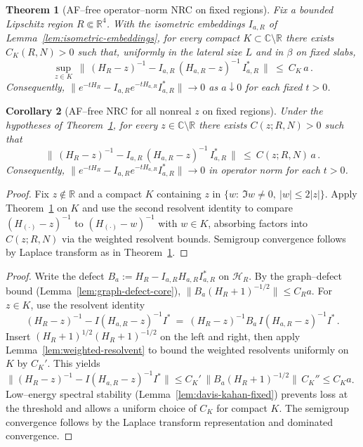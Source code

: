 \documentclass[11pt]{amsart}
\theoremstyle{plain}
\newtheorem{theorem}{Theorem}[section]
\newtheorem{corollary}[theorem]{Corollary}
\theoremstyle{definition}
\theoremstyle{remark}
\begin{document}
\begin{theorem}[AF--free operator--norm NRC on fixed regions]\label{thm:nrc-operator-norm-fixed}
Fix a bounded Lipschitz region $R\Subset\mathbb R^4$. With the isometric embeddings $I_{a,R}$ of Lemma~\ref{lem:isometric-embeddings}, for every compact $K\subset \mathbb C\setminus\mathbb R$ there exists $C_K(R,N)>0$ such that, uniformly in the lateral size $L$ and in $\beta$ on fixed slabs,
\[
  \sup_{z\in K}\ \big\|\,(H_R-z)^{-1} - I_{a,R}\,(H_{a,R}-z)^{-1}\,I_{a,R}^*\,\big\|\ \le\ C_K\, a\,.
\]
Consequently, $\|e^{-t H_R} - I_{a,R} e^{-t H_{a,R}} I_{a,R}^*\|\to 0$ as $a\downarrow 0$ for each fixed $t>0$.
\end{theorem}
\begin{corollary}[AF--free NRC for all nonreal $z$ on fixed regions]\label{cor:nrc-allz-fixed}
Under the hypotheses of Theorem~\ref{thm:nrc-operator-norm-fixed}, for every $z\in\mathbb C\setminus\mathbb R$ there exists $C(z;R,N)>0$ such that
\[
  \big\|\,(H_R-z)^{-1} - I_{a,R}\,(H_{a,R}-z)^{-1}\,I_{a,R}^*\,\big\|\ \le\ C(z;R,N)\, a\,.
\]
Consequently, $\|e^{-t H_R} - I_{a,R} e^{-t H_{a,R}} I_{a,R}^*\|\to 0$ in operator norm for each $t>0$.
\end{corollary}
\begin{proof}
Fix $z\notin\mathbb R$ and a compact $K$ containing $z$ in $\{w:\ \Im w\ne 0,\ |w|\le 2|z|\}$. Apply Theorem~\ref{thm:nrc-operator-norm-fixed} on $K$ and use the second resolvent identity to compare $(H_{(\cdot)}-z)^{-1}$ to $(H_{(\cdot)}-w)^{-1}$ with $w\in K$, absorbing factors into $C(z;R,N)$ via the weighted resolvent bounds. Semigroup convergence follows by Laplace transform as in Theorem~\ref{thm:nrc-operator-norm-fixed}.
\end{proof}
\begin{proof}
Write the defect $B_a:=H_R - I_{a,R} H_{a,R} I_{a,R}^*$ on $\mathcal H_R$. By the graph--defect bound (Lemma~\ref{lem:graph-defect-core}), $\|B_a (H_R+1)^{-1/2}\|\le C_R a$. For $z\in K$, use the resolvent identity
\[
  (H_R-z)^{-1} - I (H_{a,R}-z)^{-1} I^*
   \ =\ (H_R-z)^{-1} B_a\, I (H_{a,R}-z)^{-1} I^*\,.
\]
Insert $ (H_R+1)^{1/2}(H_R+1)^{-1/2}$ on the left and right, then apply Lemma~\ref{lem:weighted-resolvent} to bound the weighted resolvents uniformly on $K$ by $C_K'$. This yields $\|(H_R-z)^{-1} - I (H_{a,R}-z)^{-1} I^*\| \le C_K'\,\|B_a(H_R+1)^{-1/2}\|\, C_K'' \le C_K a$. Low--energy spectral stability (Lemma~\ref{lem:davis-kahan-fixed}) prevents loss at the threshold and allows a uniform choice of $C_K$ for compact $K$. The semigroup convergence follows by the Laplace transform representation and dominated convergence.
\end{proof}
\end{document}
